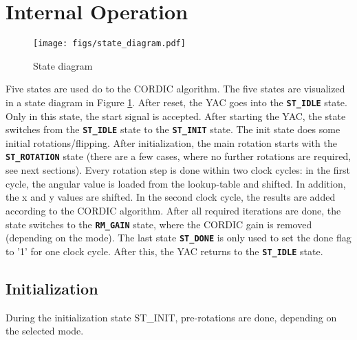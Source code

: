 \documentclass[a4paper, 12pt, notitlepage]{report}
\newcommand{\state}[1]{{\tt\textbf{#1}}}
\begin{document}
\section{Internal Operation}
\begin{figure}[p]
\centering
   \texttt{[image: figs/state\_diagram.pdf]}
   \caption{State diagram}
   \label{fig:states}
\end{figure}
Five states are used do to the CORDIC algorithm. The five states are visualized in a
state diagram in Figure \ref{fig:states}.
After reset, the YAC goes into the \state{ST\_IDLE} state. Only in this state, the 
start signal is accepted. After starting the YAC, the state switches from
the \state{ST\_IDLE} state to the \state{ST\_INIT} state. The init state does some initial 
rotations/flipping.
After initialization, the main rotation starts with the \state{ST\_ROTATION} state
(there are a few cases, where no further rotations are required, see next sections).
Every rotation step is done within two clock cycles: in the first cycle, 
the angular value is loaded from the lookup-table and shifted. In addition, 
the x and y values are shifted. In the second
clock cycle, the results are added according to the CORDIC algorithm.
After all required iterations are done, the state switches to
the \state{RM\_GAIN} state, where the CORDIC gain is removed (depending on 
the mode). The last state \state{ST\_DONE} is only used to set the done flag to 
'1' for one clock cycle. After this, the YAC returns to the \state{ST\_IDLE} state.



   \subsection{Initialization}
   During the initialization state ST\_INIT, pre-rotations are done, depending on 
   the selected mode.
   
   
\end{document}
